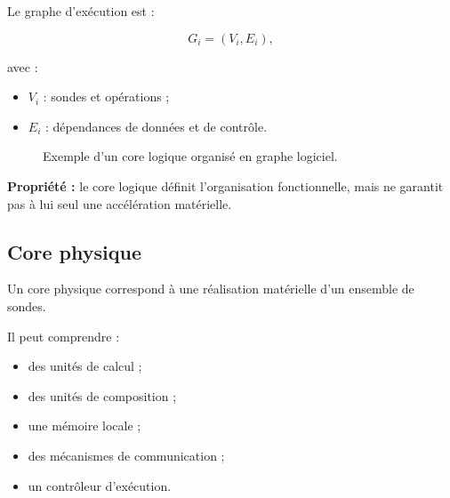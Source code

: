 \documentclass[11pt,a4paper]{article}
\begin{document}
Le graphe d'exécution est :

\[
G_i=(V_i,E_i),
\]

avec :
\begin{itemize}
  \item $V_i$ : sondes et opérations ;
  \item $E_i$ : dépendances de données et de contrôle.
\end{itemize}

\begin{figure}[H]
\centering
{}
\caption{Exemple d'un core logique organisé en graphe logiciel.}
\end{figure}

\textbf{Propriété :} le core logique définit l'organisation fonctionnelle,
mais ne garantit pas à lui seul une accélération matérielle.

\subsection{Core physique}

Un core physique correspond à une réalisation matérielle d'un ensemble
de sondes.

Il peut comprendre :
\begin{itemize}
  \item des unités de calcul ;
  \item des unités de composition ;
  \item une mémoire locale ;
  \item des mécanismes de communication ;
  \item un contrôleur d'exécution.
\end{itemize}
\end{document}
